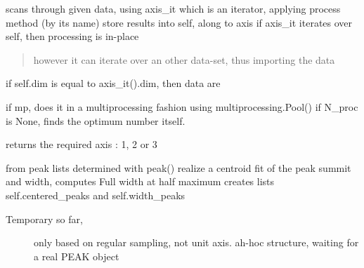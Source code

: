 \documentclass[letterpaper,10pt,openany,oneside]{sphinxmanual}
\begin{document}
\begin{fulllineitems}
\begin{fulllineitems}
\end{fulllineitems}


\begin{fulllineitems}
\label{rst/code:NPKData.NPKData.apply_process}
scans through given data, using axis\_it which is an iterator,
applying process method (by its name)
store results into self, along to axis
if axis\_it iterates over self, then processing is in-place
\begin{quote}

however it can iterate over an other data-set, thus importing the data
\end{quote}

if self.dim is equal to axis\_it().dim, then data are

if mp,  does it in a multiprocessing fashion using multiprocessing.Pool()
if N\_proc is None, finds the optimum number itself.

\end{fulllineitems}


\begin{fulllineitems}
\label{rst/code:NPKData.NPKData.axes}
returns the required axis : 1, 2 or 3

\end{fulllineitems}


\begin{fulllineitems}
\label{rst/code:NPKData.NPKData.centroid1d}
from peak lists determined with peak()
realize a centroid fit of the peak summit and width,
computes Full width at half maximum
creates lists self.centered\_peaks and self.width\_peaks
\begin{description}
\item[{Temporary  so far,}] \leavevmode
only based on regular sampling, not unit axis.
ah-hoc structure, waiting for a real PEAK object

\end{description}

\end{fulllineitems}


\end{fulllineitems}
\end{document}
